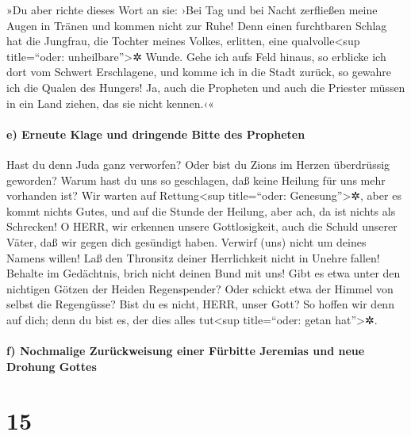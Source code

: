 »Du aber richte dieses Wort an sie: ›Bei Tag und bei
Nacht zerfließen meine Augen in Tränen und kommen nicht zur Ruhe! Denn
einen furchtbaren Schlag hat die Jungfrau, die Tochter meines Volkes,
erlitten, eine qualvolle\textless sup title=``oder:
unheilbare''\textgreater✲ Wunde. Gehe ich aufs Feld
hinaus, so erblicke ich dort vom Schwert Erschlagene, und komme ich in
die Stadt zurück, so gewahre ich die Qualen des Hungers! Ja, auch die
Propheten und auch die Priester müssen in ein Land ziehen, das sie nicht
kennen.‹«

\hypertarget{e-erneute-klage-und-dringende-bitte-des-propheten}{%
\paragraph{e) Erneute Klage und dringende Bitte des
Propheten}\label{e-erneute-klage-und-dringende-bitte-des-propheten}}

Hast du denn Juda ganz verworfen? Oder bist du Zions im
Herzen überdrüssig geworden? Warum hast du uns so geschlagen, daß keine
Heilung für uns mehr vorhanden ist? Wir warten auf Rettung\textless sup
title=``oder: Genesung''\textgreater✲, aber es kommt nichts Gutes, und
auf die Stunde der Heilung, aber ach, da ist nichts als Schrecken!
O HERR, wir erkennen unsere Gottlosigkeit, auch die
Schuld unserer Väter, daß wir gegen dich gesündigt haben.
Verwirf (uns) nicht um deines Namens willen! Laß den
Thronsitz deiner Herrlichkeit nicht in Unehre fallen! Behalte im
Gedächtnis, brich nicht deinen Bund mit uns! Gibt es etwa
unter den nichtigen Götzen der Heiden Regenspender? Oder schickt etwa
der Himmel von selbst die Regengüsse? Bist du es nicht, HERR, unser
Gott? So hoffen wir denn auf dich; denn du bist es, der dies alles
tut\textless sup title=``oder: getan hat''\textgreater✲.

\hypertarget{f-nochmalige-zuruxfcckweisung-einer-fuxfcrbitte-jeremias-und-neue-drohung-gottes}{%
\paragraph{f) Nochmalige Zurückweisung einer Fürbitte Jeremias und neue
Drohung
Gottes}\label{f-nochmalige-zuruxfcckweisung-einer-fuxfcrbitte-jeremias-und-neue-drohung-gottes}}

\hypertarget{section-14}{%
\section{15}\label{section-14}}

